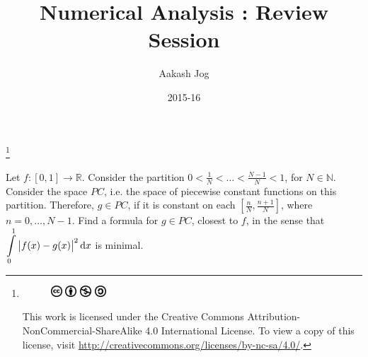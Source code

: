 \documentclass[fleqn, a4paper, 12pt, twoside, titlepage]{article}
\title{Numerical Analysis : Review Session}
\author{Aakash Jog}
\date{2015-16}
\theoremstyle{definition}
\theoremstyle{theorem}
\newcommand\blfootnote[1]{%
	\begingroup
	\renewcommand\thefootnote{}\footnote{#1}%
	\addtocounter{footnote}{-1}%
	\endgroup
}
\begin{document}
\maketitle

\blfootnote
{	
	\begin{figure}[H]
		\includegraphics[height = 12pt]{cc.eps}
		\includegraphics[height = 12pt]{by.eps}
		\includegraphics[height = 12pt]{nc.eps}
		\includegraphics[height = 12pt]{sa.eps}
	\end{figure}
	This work is licensed under the Creative Commons Attribution-NonCommercial-ShareAlike 4.0 International License. To view a copy of this license, visit \url{http://creativecommons.org/licenses/by-nc-sa/4.0/}.
} %

\tableofcontents

\newpage

\begin{question}
	Let $f : [0,1] \to \mathbb{R}$.
	Consider the partition $0 < \frac{1}{N} < \dots < \frac{N - 1}{N} < 1$, for $N \in \mathbb{N}$.
	Consider the space $\mathit{PC}$, i.e. the space of piecewise constant functions on this partition.
	Therefore, $g \in \mathit{PC}$, if it is constant on each $\left[ \frac{n}{N},\frac{n + 1}{N} \right]$, where $n = 0,\dots,N - 1$.
	Find a formula for $g \in \mathit{PC}$, closest to $f$, in the sense that $\displaystyle \int\limits_{0}^{1} \left| f(x) - g(x) \right|^2 \dif x$ is minimal.
\end{question}
\end{document}
